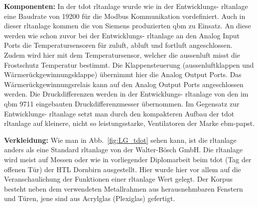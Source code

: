 \textbf{Komponenten:}
In der \gls{tdot} \ac{rltanlage} wurde wie in der Entwicklungs- \ac{rltanlage} eine Baudrate von 19200 für die Modbus Kommunikation vordefiniert. Auch in dieser \ac{rltanlage} kommen die von Siemens produzierten \gls{qbm} zu Einsatz. An diese werden wie schon zuvor bei der Entwicklungs- \ac{rltanlage} an den Analog Input Ports die Temperatursensoren für \gls{zuluft}, \gls{abluft} und \gls{fortluft} angeschlossen. Zudem wird hier mit dem Temperatursensor, welcher die \gls{aussenluft} misst die Frostschutz Temperatur bestimmt. Die Klappensteuerung (\gls{aussenluft}klappen und Wärmerückgewinnungsklappe) übernimmt hier die Analog Output Ports. Das  Wärmerückgewinnungsrelais kann auf den Analog Output Ports angeschlossen werden. Die Druckdifferenzen werden in der Entwicklungs- \ac{rltanlage} von den im \gls{qbm} 9711 eingebauten Druckdifferenzmesser übernommen. Im Gegensatz zur Entwicklungs- \ac{rltanlage} setzt man durch den kompakteren Aufbau der \gls{tdot} \ac{rltanlage} auf kleinere, nicht so leistungsstarke, Ventilatoren der Marke ebm-papst. 


\textbf{Verkleidung:}
Wie man in Abb.~\ref{fig:LG_tdot} sehen kann, ist die \ac{rltanlage} anders als eine Standard \ac{rltanlage} von der Walter-Bösch GmbH. Die \ac{rltanlage} wird meist auf Messen oder wie in vorliegender Diplomarbeit beim \gls{tdot} (Tag der offenen Tür) der HTL Dornbirn ausgestellt. Hier wurde hier vor allem auf die Veranschaulichung der Funktionen einer \ac{rltanlage} Wert gelegt. Der Korpus besteht neben dem verwendeten Metallrahmen aus herausnehmbaren Fenstern und Türen, jene sind aus Acrylglas (Plexiglas) gefertigt. 

\newpage
